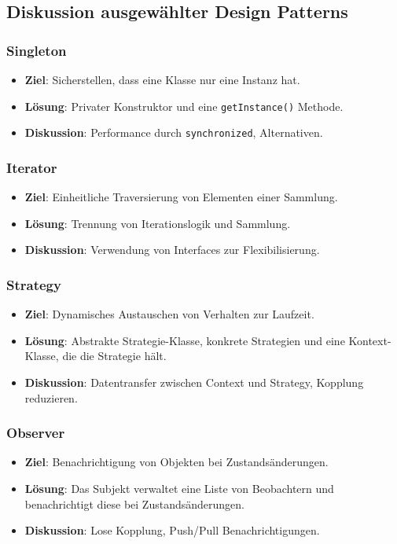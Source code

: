 \documentclass[11pt, a4paper]{article}
\begin{document}
\newpage

\subsection{Diskussion ausgewählter Design Patterns}

\subsubsection{Singleton}
\begin{itemize}
    \item \textbf{Ziel}: Sicherstellen, dass eine Klasse nur eine Instanz hat.
    \item \textbf{Lösung}: Privater Konstruktor und eine \texttt{getInstance()} Methode.
    \item \textbf{Diskussion}: Performance durch \texttt{synchronized}, Alternativen.
\end{itemize}

\subsubsection{Iterator}
\begin{itemize}
    \item \textbf{Ziel}: Einheitliche Traversierung von Elementen einer Sammlung.
    \item \textbf{Lösung}: Trennung von Iterationslogik und Sammlung.
    \item \textbf{Diskussion}: Verwendung von Interfaces zur Flexibilisierung.
\end{itemize}

\subsubsection{Strategy}
\begin{itemize}
    \item \textbf{Ziel}: Dynamisches Austauschen von Verhalten zur Laufzeit.
    \item \textbf{Lösung}: Abstrakte Strategie-Klasse, konkrete Strategien und eine Kontext-Klasse, die die Strategie hält.
    \item \textbf{Diskussion}: Datentransfer zwischen Context und Strategy, Kopplung reduzieren.
\end{itemize}

\subsubsection{Observer}
\begin{itemize}
    \item \textbf{Ziel}: Benachrichtigung von Objekten bei Zustandsänderungen.
    \item \textbf{Lösung}: Das Subjekt verwaltet eine Liste von Beobachtern und benachrichtigt diese bei Zustandsänderungen.
    \item \textbf{Diskussion}: Lose Kopplung, Push/Pull Benachrichtigungen.
\end{itemize}
\end{document}

